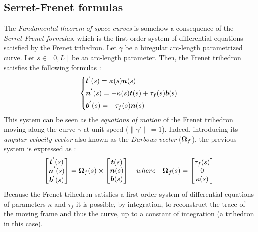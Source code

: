 \subsection{Serret-Frenet formulas}\label{sec:serret}
The \emph{Fundamental theorem of space curves} is somehow a consequence of the \emph{Serret-Frenet formulas}, which is the first-order system of differential equations satisfied by the Frenet trihedron. Let $\gamma$ be a biregular arc-length parametrized curve. Let $s \in [0,L]$ be an arc-length parameter. Then, the Frenet trihedron satisfies the following formulas :
\begin{equation}
	\left\{
	\begin{aligned}
		&\boldsymbol{t^{'}}(s) 	=  \kappa_{}(s) \boldsymbol{n}(s)\\
		&\boldsymbol{n^{'}}(s) 	=  -\kappa_{}(s) \boldsymbol{t}(s) + \tau_f(s) \boldsymbol{b}(s) \\
		&\boldsymbol{b^{'}}(s) 	=  -\tau_f(s) \boldsymbol{n}(s) \\
	\end{aligned}
	\right.
\end{equation}
This system can be seen as the \emph{equations of motion} of the Frenet trihedron moving along the curve $\gamma$ at unit speed ($\|\gamma'\|=1$). Indeed, introducing its \emph{angular velocity vector} also known as the \emph{Darboux vector} ($\boldsymbol{\Omega_f}$), the previous system is expressed as :
\begin{equation}
	\begin{bmatrix}		
		\boldsymbol{t^{'}}(s) \\
		\boldsymbol{n^{'}}(s) \\
		\boldsymbol{b^{'}}(s) \\
	\end{bmatrix}
	=
	\boldsymbol{\Omega_f}(s)
	\times
	\begin{bmatrix}		
		\boldsymbol{t}(s) \\
		\boldsymbol{n}(s) \\
		\boldsymbol{b}(s) \\
	\end{bmatrix}
	\quad where \quad
	\boldsymbol{\Omega_f}(s)
	=
	\begin{bmatrix}
		\tau_f(s) \\
		0 \\
		\kappa(s)
	\end{bmatrix}
\end{equation}
Because the Frenet trihedron satisfies a first-order system of differential equations of parameters $\kappa$ and $\tau_f$ it is possible, by integration, to reconstruct the trace of the moving frame and thus the curve, up to a constant of integration (a trihedron in this case).

